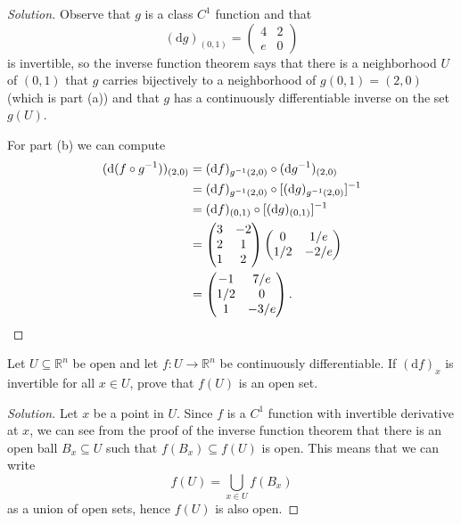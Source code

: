 \documentclass[10pt]{scrartcl}
\providecommand{\RR}{\mathbb R}
\providecommand{\inv}{^{-1}}
\newenvironment{soln}{\begin{proof}[Solution]}{\end{proof}}
\begin{document}
\begin{soln}
	Observe that $g$ is a class $C^1$ function and that
	\[(\mathrm dg)_{(0,1)} = \begin{pmatrix}
		4&2\\e&0
	\end{pmatrix}\]
	is invertible, so the inverse function theorem says that
	there is a neighborhood $U$ of $(0,1)$ that $g$ carries bijectively
	to a neighborhood of $g(0,1) = (2,0)$ (which is part (a))
	and that $g$ has a continuously differentiable inverse on the set $g(U)$.
	
	For part (b) we can compute
	\begin{align*}
		(\mathrm d(f\circ g\inv))_{(2,0)}
		&= (\mathrm df)_{g\inv(2,0)}\circ (\mathrm dg\inv)_{(2,0)}\\
		&= (\mathrm df)_{g\inv(2,0)}\circ [(\mathrm dg)_{g\inv(2,0)}]\inv\\
		&= (\mathrm df)_{(0,1)}\circ [(\mathrm dg)_{(0,1)}]\inv\\
		&= \begin{pmatrix}
			3&-2\\2&1\\1&2
		\end{pmatrix}\begin{pmatrix}
			0&1/e\\1/2&-2/e
		\end{pmatrix}\\
		&= \begin{pmatrix}
			-1&7/e\\1/2&0\\1&-3/e
		\end{pmatrix}.\qedhere
	\end{align*}
\end{soln}

\begin{problem}
	Let $U\subseteq\RR^n$ be open and let $f\colon U\to\RR^n$
	be continuously differentiable. If $(\mathrm df)_x$ is invertible
	for all $x\in U$, prove that $f(U)$ is an open set.
\end{problem}

\begin{soln}
	Let $x$ be a point in $U$.
	Since $f$ is a $C^1$ function with invertible derivative at $x$,
	we can see from the proof of the inverse function theorem that
	there is an open ball $B_x\subseteq U$ such that
	$f(B_x)\subseteq f(U)$ is open. This means that we can write
	\[f(U) = \bigcup_{x\in U} f(B_x)\]
	as a union of open sets, hence $f(U)$ is also open.
\end{soln}
\end{document}
